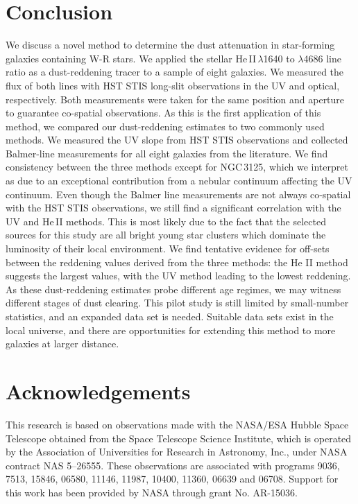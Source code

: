 \documentclass[linenumbers]{aastex63}
\begin{document}
\section{Conclusion}\label{sect:conclusion}
We discuss a novel method to determine the dust attenuation in star-forming galaxies containing W-R stars. We applied the stellar He\,II\,$\lambda$1640 to $\lambda$4686 line ratio as a dust-reddening tracer to a sample of eight galaxies. We measured the flux of both lines with HST STIS long-slit observations in the UV and optical, respectively. Both measurements were taken for the same position and aperture to guarantee co-spatial observations. 
As this is the first application of this method, we compared our dust-reddening estimates to two commonly used methods. We measured the UV slope from HST STIS observations and collected Balmer-line measurements for all eight galaxies from the literature.
We find consistency between the three methods except for NGC\,3125, which we interpret as due to an exceptional contribution from a nebular continuum affecting the UV continuum. Even though the Balmer line measurements are not always co-spatial with the HST STIS observations, we still find a significant correlation with the UV and He\,II methods. This is most likely due to the fact that the selected sources for this study are all bright young star clusters which dominate the luminosity of their local environment. We find tentative evidence for off-sets between the reddening values derived from the three methods: the He II method suggests the largest values, with the UV method leading to the lowest reddening. As these dust-reddening estimates probe different age regimes, we may witness different stages of dust clearing. This pilot study is still limited by small-number statistics, and an expanded data set is needed. Suitable data sets exist in the local universe, and there are opportunities for extending this method to more galaxies at larger distance.


\section*{Acknowledgements}
This research is based on observations made with the NASA/ESA Hubble Space Telescope obtained from the Space Telescope Science Institute, which is operated by the Association of Universities for Research in Astronomy, Inc., under NASA contract NAS 5–26555. These observations are associated with programs  9036, 7513, 15846, 06580, 11146, 11987, 10400, 11360, 06639 and 06708. 
Support for this work has been provided by NASA through grant No. AR-15036.
\end{document}
